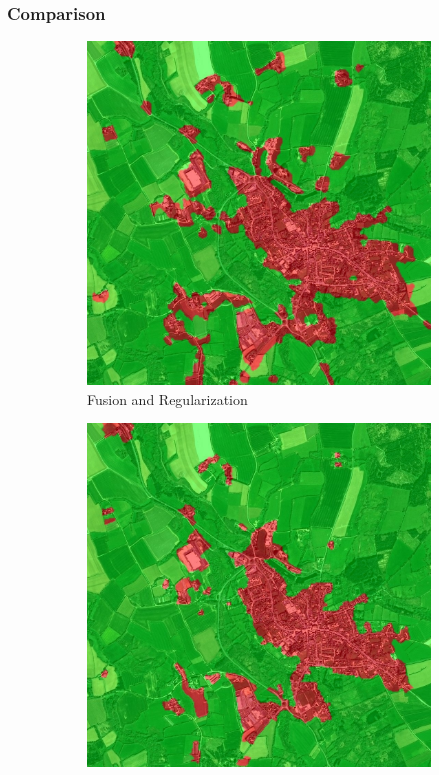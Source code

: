 \documentclass[10pt]{article}
\begin{document}
\subsubsection{Comparison}
\begin{figure}[H]
    \centering
    \begin{subfigure}{0.49\textwidth}
        \centering
        \includegraphics[width=\textwidth]{R2_T41000_30000_regul_proba_Fusion_Min_100_1000_100_0_100_70_100_200_0_0_0}
        \caption{Fusion and Regularization}
        \label{subfig:fusionRegComp}
    \end{subfigure}
    \begin{subfigure}{0.49\textwidth}
        \centering
        \includegraphics[width=\textwidth]{regul_seg_maj_20}

\end{subfigure}
\end{figure}
\end{document}
